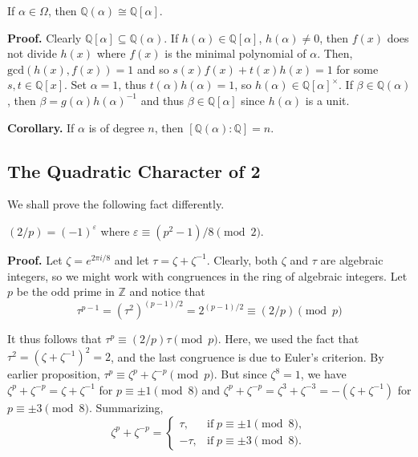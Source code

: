 \documentclass{template}
\begin{document}
\begin{proposition}
    If $\alpha \in \Omega$, then $\mathbb{Q}(\alpha) \cong \mathbb{Q}[\alpha]$.
\end{proposition}

\textbf{Proof.} Clearly $\mathbb{Q}[\alpha] \subseteq \mathbb{Q}(\alpha)$. If
$h(\alpha) \in \mathbb{Q}[\alpha]$, $h(\alpha) \neq 0$, then $f(x)$ does not
divide $h(x)$ where $f(x)$ is the minimal polynomial of $\alpha$. Then,
$\text{gcd}(h(x),f(x)) = 1$ and so $s(x)f(x)+t(x)h(x)=1$ for some $s,t \in
\mathbb{Q}[x]$. Set $\alpha=1$, thus $t(\alpha)h(\alpha)=1$, so $h(\alpha) \in
\mathbb{Q}[\alpha]^{\times}$. If $\beta \in \mathbb{Q}(\alpha)$, then $\beta =
g(\alpha)h(\alpha)^{-1}$ and thus $\beta \in \mathbb{Q}[\alpha]$ since
$h(\alpha)$ is a unit.

\textbf{Corollary.} If $\alpha$ is of degree $n$, then
$[\mathbb{Q}(\alpha):\mathbb{Q}]=n$.

\subsection{The Quadratic Character of 2}

We shall prove the following fact differently.

\begin{proposition}
    $(2/p)=(-1)^{\varepsilon}$ where $\varepsilon \equiv (p^2-1)/8 \pmod{2}$.
\end{proposition}

\textbf{Proof.} Let $\zeta = e^{2\pi i/8}$ and let $\tau = \zeta+\zeta^{-1}$.
Clearly, both $\zeta$ and $\tau$ are algebraic integers, so we might work with
congruences in the ring of algebraic integers. Let $p$ be the odd prime in
$\mathbb{Z}$ and notice that
\begin{equation*}
    \tau^{p-1} = (\tau^2)^{(p-1)/2} = 2^{(p-1)/2} \equiv (2/p) \pmod{p}
\end{equation*}

It thus follows that $\tau^p \equiv (2/p)\tau \pmod{p}$. Here, we used the fact
that $\tau^2 = (\zeta+\zeta^{-1})^2=2$, and the last congruence is due to
Euler's criterion. By earlier proposition, $\tau^p \equiv \zeta^p + \zeta^{-p}
\pmod{p}$. But since $\zeta^8=1$, we have $\zeta^p+\zeta^{-p}=\zeta+\zeta^{-1}$
for $p \equiv \pm 1 \pmod{8}$ and $\zeta^p+\zeta^{-p} = \zeta^3 + \zeta^{-3} = -(\zeta+\zeta^{-1})$ 
for $p \equiv \pm 3 \pmod{8}$. Summarizing,
\begin{equation*}
    \zeta^p + \zeta^{-p} = \begin{cases}
        \tau, & \text{if} \; p \equiv \pm 1 \pmod{8}, \\
        -\tau, & \text{if} \; p \equiv \pm 3 \pmod{8}.
    \end{cases}
\end{equation*}
\end{document}
